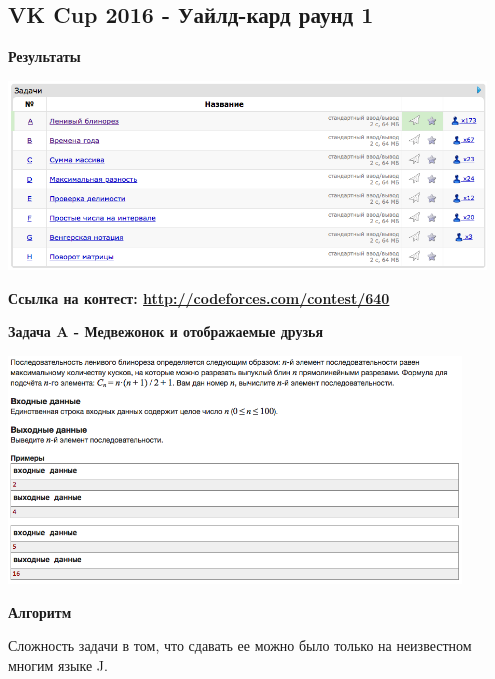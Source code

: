 \documentclass[a4paper,12pt]{article}
\begin{document}
%
%

\newpage
\subsection{VK Cup 2016 - Уайлд-кард раунд 1}

\textbf{{\large Результаты}} \\
\begin{center}
\includegraphics[width=0.95\textwidth]{VK_UK/result.png}\\ [1cm]
\end{center}

\textbf{{\large Ссылка на контест: \url{http://codeforces.com/contest/640}}}

\newpage
\textbf{{\large Задача A - Медвежонок и отображаемые друзья}}

\begin{center}
\includegraphics[width=0.9\textwidth]{VK_UK/A.png}\\ [1cm]
\end{center}

\textbf{{\large Алгоритм}}

Сложность задачи в том, что сдавать ее можно было только на неизвестном многим языке J.\\
\end{document}
